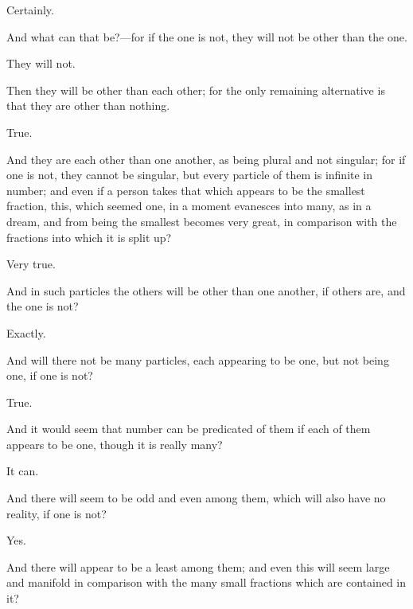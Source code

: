 \documentclass[11pt,letter]{article}
\begin{document}
\par  Certainly.

\par  And what can that be?—for if the one is not, they will not be other than the one.

\par  They will not.

\par  Then they will be other than each other; for the only remaining alternative is that they are other than nothing.

\par  True.

\par  And they are each other than one another, as being plural and not singular; for if one is not, they cannot be singular, but every particle of them is infinite in number; and even if a person takes that which appears to be the smallest fraction, this, which seemed one, in a moment evanesces into many, as in a dream, and from being the smallest becomes very great, in comparison with the fractions into which it is split up?

\par  Very true.

\par  And in such particles the others will be other than one another, if others are, and the one is not?

\par  Exactly.

\par  And will there not be many particles, each appearing to be one, but not being one, if one is not?

\par  True.

\par  And it would seem that number can be predicated of them if each of them appears to be one, though it is really many?

\par  It can.

\par  And there will seem to be odd and even among them, which will also have no reality, if one is not?

\par  Yes.

\par  And there will appear to be a least among them; and even this will seem large and manifold in comparison with the many small fractions which are contained in it?
\end{document}
